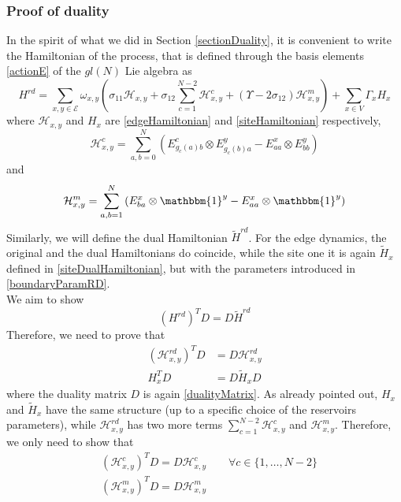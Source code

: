 \documentclass[10pt]{article}
\numberwithin{equation}{section}
\numberwithin{equation}{subsection}
\begin{document}
\subsubsection{Proof of duality}
In the spirit of what we did in Section \ref{sectionDuality}, it is convenient to write the Hamiltonian of the process, that is defined through the basis elements \eqref{actionE} of the $gl(N)$ Lie algebra as 
\begin{equation}
	H^{rd}=\sum_{x,y\in \mathcal{E}}\omega_{x,y}\left(\sigma_{11}\mathcal{H}_{x,y}+\sigma_{12}\sum_{c=1}^{N-2}\mathcal{H}_{x,y}^{c}+(\Upsilon-2\sigma_{12})\mathcal{H}_{x,y}^{m}\right)+\sum_{x\in V}\Gamma_{x}H_{x}
\end{equation}
where $\mathcal{H}_{x,y}$ and $H_{x}$ are \eqref{edgeHamiltonian} and \eqref{siteHamiltonian} respectively, 
\begin{equation}
	\mathcal{H}_{x,y}^{c}=\sum_{a,b=0}^{N}\left(E_{g_{c}(a)b}^{c}\otimes E_{g_{c}(b)a}^{y}-E_{aa}^{x}\otimes E_{bb}^{y}\right)
\end{equation}
and 
\begin{equation}
	\mathcal{H}_{x,y}^{m}=\sum_{a,b=1}^{N}\left(E_{ba}^{x}\otimes \mathbbm{1}^{y}-E_{aa}^{x}\otimes \mathbbm{1}^{y}\right)
\end{equation}
Similarly, we will define the dual Hamiltonian $\widetilde{H}^{rd}$. For the edge dynamics, the original and the dual Hamiltonians do coincide, while the site one it is again $\widetilde{H}_{x}$ defined in \eqref{siteDualHamiltonian}, but with the parameters introduced in \eqref{boundaryParamRD}.\\ We aim to show
\begin{equation}\label{DualityRelationRD}
	(H^{rd})^{T}D=D\widetilde{H}^{rd}
\end{equation}
Therefore, we need to prove that
\begin{align}
	(\mathcal{H}_{x,y}^{rd})^{T}D&=D\mathcal{H}_{x,y}^{rd}\label{edgeDualityRelationRD}\\
	H_{x}^{T}D&=D\widetilde{H}_{x}D\label{siteDualityRelationRD}
\end{align}
where the duality matrix $D$ is again \eqref{dualityMatrix}. As already pointed out, $H_{x}$ and $\widetilde{H}_{x}$ have the same structure (up to a specific choice of the reservoirs parameters), while $\mathcal{H}_{x,y}^{rd}$ has two more terms $\sum_{c=1}^{N-2}\mathcal{H}_{x,y}^{c}$ and $\mathcal{H}_{x,y}^{m}$. Therefore, we only need to show that 
\begin{align}
	&(\mathcal{H}_{x,y}^{c})^{T}D=D\mathcal{H}_{x,y}^{c}\qquad \forall c\in \{1,\ldots,N-2\}\label{cDualityRelation}\\
	&(\mathcal{H}_{x,y}^{m})^{T}D=D\mathcal{H}_{x,y}^{m}\label{mDualityRelation}
\end{align}
\end{document}
